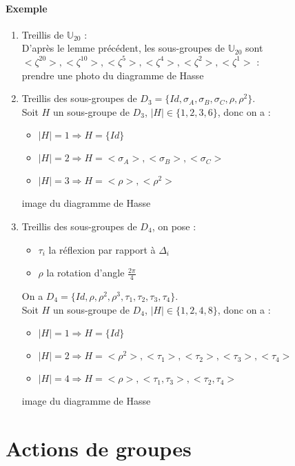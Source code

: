 \documentclass[a4paper, oneside]{report}
\newcommand{\U}{\mathbb{U}}
\begin{document}
\subsubsection{Exemple}
\begin{enumerate}
\item Treillis de $\U_{20}$ :\\
D'après le lemme précédent, les sous-groupes de $\U_{20}$ sont $<\zeta^{20}>,<\zeta^{10}>,<\zeta^{5}>,<\zeta^{4}>,<\zeta^{2}>,<\zeta^{1}>$ :\\
prendre une photo du diagramme de Hasse

\item Treillis des sous-groupes de $D_3=\{Id, \sigma_A, \sigma_B, \sigma_C, \rho, \rho^2\}$.\\
Soit $H$ un sous-groupe de $D_3$, $|H|\in \{1,2,3,6 \}$, donc on a :
\begin{itemize}
\item $|H| = 1\Rightarrow H=\{Id\}$
\item $|H|=2\Rightarrow H=<\sigma_A>, <\sigma_B>, <\sigma_C>$
\item $|H|=3 \Rightarrow H= <\rho>, <\rho^2>$
\end{itemize}
image du diagramme de Hasse

\item Treillis des sous-groupes de $D_4$, on pose :
\begin{itemize}
\item $\tau_i$ la réflexion par rapport à $\Delta_i$
\item $\rho$ la rotation d'angle $\frac{2\pi}{4}$
\end{itemize}
On a $D_4=\{Id, \rho,\rho^2,\rho^3,\tau_1,\tau_2, \tau_3, \tau_4 \}$.\\
Soit $H$ un sous-groupe de $D_4$, $|H|\in \{1,2,4,8 \}$, donc on a :
\begin{itemize}
\item $|H| = 1\Rightarrow H=\{Id\}$
\item $|H|=2\Rightarrow H=<\rho^2>,<\tau_1>,<\tau_2>,<\tau_3>,<\tau_4>$
\item $|H|=4 \Rightarrow H= <\rho>, <\tau_1,\tau_3>,<\tau_2,\tau_4>$
\end{itemize}
image du diagramme de Hasse

\end{enumerate}

\chapter{Actions de groupes}
\end{document}
